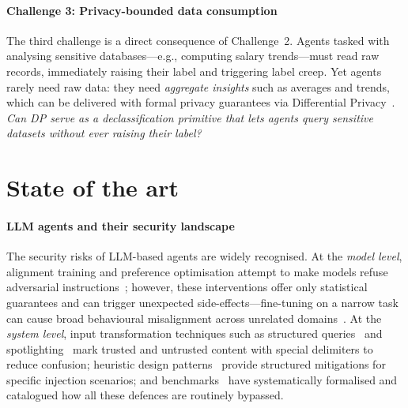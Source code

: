 \documentclass{kaw}
\begin{document}
%
\paragraph{Challenge 3: Privacy-bounded data consumption}
The third challenge is a direct consequence of Challenge~2.
%
Agents tasked with analysing sensitive databases---e.g., computing salary
trends---must read raw records, immediately raising their label and triggering
label creep.
%
Yet agents rarely need raw data: they need \emph{aggregate insights} such as
averages and trends, which can be delivered with formal privacy guarantees via
Differential Privacy~\cite{Dwork:2006}.
%
\emph{Can DP serve as a declassification primitive that lets agents query
sensitive datasets without ever raising their label?}
%

\section{State of the art}
\label{sec:sota}

\paragraph{LLM agents and their security landscape}
The security risks of LLM-based agents are widely recognised. 
At the \emph{model level}, alignment training and preference optimisation
attempt to make models refuse adversarial
instructions~\cite{Chen:SecAlign:25}; however, these
interventions offer only statistical guarantees and can trigger unexpected
side-effects---fine-tuning on a narrow task can cause broad behavioural
misalignment across unrelated domains~\cite{Betley:Misalignment26}.
%
At the \emph{system level}, input transformation techniques such as
structured queries~\cite{Chen:StruQ:25} and
spotlighting~\cite{BeurerKellner:Patterns25} mark trusted and untrusted content
with special delimiters to reduce confusion; heuristic design
patterns~\cite{BeurerKellner:Patterns25} provide structured mitigations for
specific injection scenarios; and benchmarks~\cite{Liu:FormalizingPI:24,Debenedetti:AgentDojo24,Zhao:ParasiticMCP26}
have systematically formalised and catalogued how all these defences are
routinely bypassed.
%
%
\end{document}
